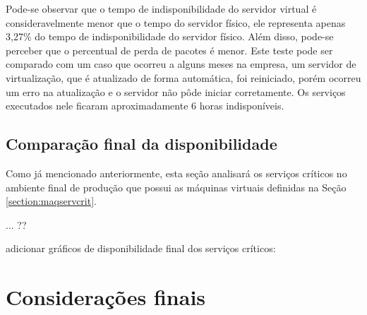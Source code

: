 Pode-se observar que o tempo de indisponibilidade do servidor virtual é consideravelmente menor que o tempo do servidor físico, ele representa 
apenas 3,27\% do tempo de indisponibilidade do servidor físico. Além disso, pode-se perceber que o percentual de perda de pacotes é menor.
Este teste pode ser comparado com um caso que ocorreu a alguns meses na empresa, um servidor de virtualização, que é atualizado de forma automática,
foi reiniciado, porém ocorreu um erro na atualização e o servidor não pôde iniciar corretamente. Os serviços executados nele ficaram 
aproximadamente 6 horas indisponíveis.

\subsection{Comparação final da disponibilidade}
\label{section:comparacaofinal}

Como já mencionado anteriormente, esta seção analisará os serviços críticos no ambiente final de produção que possui as máquinas virtuais
definidas na Seção \ref{section:maqservcrit}. 

... ??

adicionar gráficos de disponibilidade final dos serviços críticos:



\section{Considerações finais}

